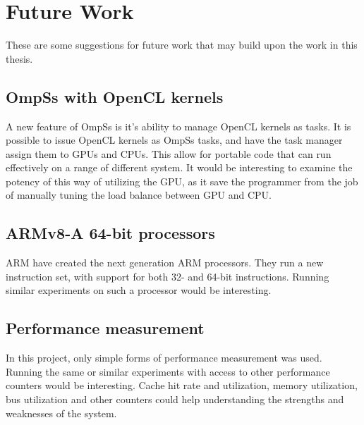 \chapter[Future Work]{Future Work}
These are some suggestions for future work that may build upon the work in this thesis.

\section{OmpSs with OpenCL kernels}
A new feature of OmpSs is it's ability to manage OpenCL kernels as tasks.
It is possible to issue OpenCL kernels as OmpSs tasks, and have the task manager assign them to GPUs and CPUs.
This allow for portable code that can run effectively on a range of different system.
It would be interesting to examine the potency of this way of utilizing the GPU, as it save the programmer from the job of manually tuning the load balance between GPU and CPU.

\section{ARMv8-A 64-bit processors}
ARM have created the next generation ARM processors.
They run a new instruction set, with support for both 32- and 64-bit instructions.
Running similar experiments on such a processor would be interesting.

\section{Performance measurement}
In this project, only simple forms of performance measurement was used.
Running the same or similar experiments with access to other performance counters would be interesting.
Cache hit rate and utilization, memory utilization, bus utilization and other counters could help understanding the strengths and weaknesses of the system.

